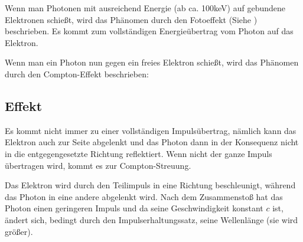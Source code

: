 Wenn man Photonen mit ausreichend Energie (ab ca. 100keV) auf gebundene Elektronen schießt, wird das Phänomen durch den Fotoeffekt (Siehe ) beschrieben. Es kommt zum vollständigen Energieübertrag vom Photon auf das Elektron.

Wenn man ein Photon nun gegen ein freies Elektron schießt, wird das Phänomen durch den Compton-Effekt beschrieben:

\subsection{Effekt}

Es kommt nicht immer zu einer vollständigen Impulsübertrag, nämlich kann das Elektron auch zur Seite abgelenkt und das Photon dann in der Konsequenz nicht in die entgegengesetzte Richtung reflektiert. Wenn nicht der ganze Impuls übertragen wird, kommt es zur Compton-Streuung. 

Das Elektron wird durch den Teilimpuls in eine Richtung beschleunigt, während das Photon in eine andere abgelenkt wird. Nach dem Zusammenstoß hat das Photon einen geringeren Impuls und da seine Geschwindigkeit konstant $c$ ist, ändert sich, bedingt durch den Impulserhaltungssatz, seine Wellenlänge (sie wird größer).

\begin{comment}\item Durch den Impulserhaltungssatz gilt:\\
Vor Kollision:\\
$p_{gesamt} = p_{Phot} \rightarrow p_{gesamt}=\frac{h}{\lambda}$


Nach Kollision: \\
$p_{gesamt} = p'_{phot} + p_e$

$\frac{h}{\lambda} = \frac{h}{\lambda'} + m_e \cdot v$

$\frac{h}{\lambda} = \frac{h}{\lambda} \cdot \cos{\Theta} + \frac{h}{\lambda} \cdot (1-\cos{\Theta})$ \tabto{0.5\textwidth} ; $c = \lambda * f \rightarrow \lambda = c / f$

$\frac{h}{\lambda} = \frac{h}{\lambda} \cdot \cos{\Theta} + \frac{h}{\lambda} \cdot (1-\cos{\Theta})$





$m_e \cdot v = \frac{h}{\lambda}$ \tabto{0.5\textwidth} ; umstellen nach $\lambda$ 


$\lambda' = \lambda + \Delta\lambda$

$\lambda' - \lambda = \Delta\lambda$

$\lambda' - \lambda = $


$\lambda = \frac{h}{m_e \cdot v}$

\end{comment}

